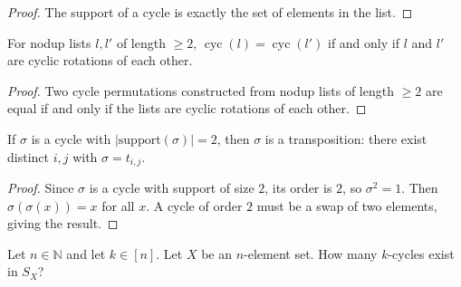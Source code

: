 \begin{proof}
\leanok
The support of a cycle is exactly the set of elements in the list.
\end{proof}

\begin{lemma}
\label{lem.perm.cycs.eq_iff}
\leanhelper
\leanok
For nodup lists $l, l'$ of length $\ge 2$,
$\operatorname{cyc}(l) = \operatorname{cyc}(l')$ if and only if $l$ and $l'$
are cyclic rotations of each other.
\end{lemma}

\begin{proof}
\leanok
Two cycle permutations constructed from nodup lists of length $\ge 2$ are equal if and only if the lists are cyclic rotations of each other.
\end{proof}

\begin{lemma}
\label{lem.perm.cycs.2cycle_is_transposition}
\leanhelper
\leanok
If $\sigma$ is a cycle with $|\mathrm{support}(\sigma)| = 2$, then
$\sigma$ is a transposition: there exist distinct $i, j$ with
$\sigma = t_{i,j}$.
\end{lemma}

\begin{proof}
\leanok
Since $\sigma$ is a cycle with support of size $2$, its order is $2$, so
$\sigma^2 = 1$.  Then $\sigma(\sigma(x)) = x$ for all $x$.
A cycle of order $2$ must be a swap of two elements, giving the result.
\end{proof}

\begin{exercise}
\label{exe.perm.cyc.how-many-kcyc}
\leanok
Let $n \in \mathbb{N}$ and let $k \in [n]$. Let $X$ be an
$n$-element set. How many $k$-cycles exist in $S_X$?
\end{exercise}

